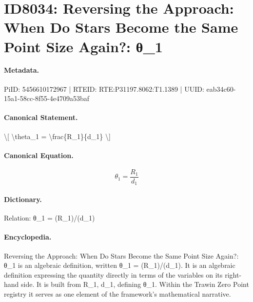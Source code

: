 \section*{ID8034: Reversing the Approach: When Do Stars Become the Same Point Size Again?: θ\_1}
\paragraph{Metadata.}
PiID: 5456610172967 | RTEID: RTE:P31197.8062:T1.1389 | UUID: eab34c60-15a1-58cc-8f55-4e4709a53baf

\paragraph{Canonical Statement.}
\textbackslash{}[ \textbackslash{}theta\_1 = \textbackslash{}frac\{R\_1\}\{d\_1\} \textbackslash{}]

\paragraph{Canonical Equation.}
\[
\theta_1 = \frac{R_1}{d_1}
\]

\paragraph{Dictionary.}
Relation: θ\_1 = (R\_1)/(d\_1)

\paragraph{Encyclopedia.}
Reversing the Approach: When Do Stars Become the Same Point Size Again?: θ\_1 is an algebraic definition, written θ\_1 = (R\_1)/(d\_1). It is an algebraic definition expressing the quantity directly in terms of the variables on its right-hand side. It is built from R\_1, d\_1, defining θ\_1. Within the Trawin Zero Point registry it serves as one element of the framework's mathematical narrative.
